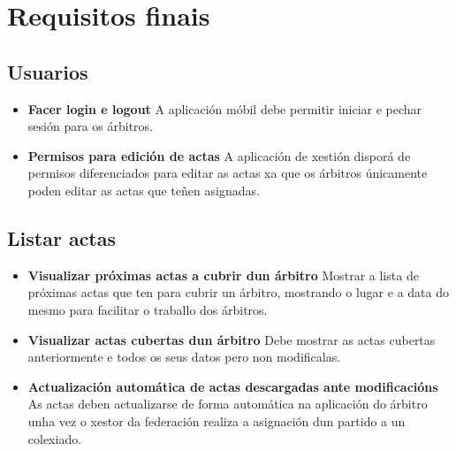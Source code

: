   \clearpage

  \section{Requisitos finais}
  \label{sec:analisis:requisitos}
  

  \subsection{Usuarios}

    \begin{itemize}

    \item \textbf{Facer login e logout}
    A aplicación móbil debe permitir iniciar e pechar sesión para os árbitros.

    \item \textbf{Permisos para edición de actas}
    A aplicación de xestión disporá de permisos diferenciados para editar as 
actas xa que os árbitros únicamente poden editar as actas que teñen asignadas.

    \end{itemize}

  \subsection{Listar actas}

    \begin{itemize}

    \item \textbf{Visualizar próximas actas a cubrir dun árbitro}
    Mostrar a lista de próximas actas que ten para cubrir un árbitro, mostrando 
o lugar e a data do mesmo para facilitar o traballo dos árbitros.

    \item \textbf{Visualizar actas cubertas dun árbitro}
    Debe mostrar as actas cubertas anteriormente e todos os seus datos pero non 
modificalas.

    \item \textbf{Actualización automática de actas descargadas ante 
modificacións}
    As actas deben actualizarse de forma automática na aplicación do árbitro 
unha vez o xestor da federación realiza a asignación dun partido a un colexiado.

    \end{itemize}

